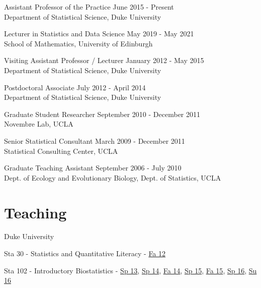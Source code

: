 \documentclass[margin,line]{res}
\begin{document}
\begin{resume}
Assistant Professor of the Practice \hfill June 2015 - Present \\
{Department of Statistical Science}, Duke University \\
\vspace{-0.5cm}

Lecturer in Statistics and Data Science \hfill May 2019 - May 2021 \\
{School of Mathematics}, University of Edinburgh \\
\vspace{-0.5cm}

Visiting Assistant Professor / Lecturer  \hfill January 2012 - May 2015 \\
{Department of Statistical Science}, Duke University \\
\vspace{-0.5cm}

Postdoctoral Associate  \hfill July 2012 - April 2014 \\
{Department of Statistical Science}, Duke University \\
\vspace{-0.5cm}

Graduate Student Researcher \hfill September 2010 - December 2011 \\
{Novembre Lab}, UCLA \\
\vspace{-0.5cm}

Senior Statistical Consultant \hfill March 2009 - December 2011 \\
{Statistical Consulting Center}, UCLA \\
\vspace{-0.50cm}

Graduate Teaching Assistant \hfill September 2006 - July 2010 \\
{Dept. of Ecology and Evolutionary Biology, Dept. of Statistics}, UCLA \\


\section{\sc Teaching}


Duke University

\begin{list1}
\item[] Sta 30 - Statistics and Quantitative Literacy - \href{http://stat.duke.edu/courses/Spring12/sta10.1}{Fa 12}

\item[] Sta 102 - Introductory Biostatistics - \href{http://stat.duke.edu/courses/Spring13/sta102.001/}{Sp 13}, \href{https://stat.duke.edu/~cr173/Sta102_Sp14/}{Sp 14}, \href{https://stat.duke.edu/~cr173/Sta102_Fa14/}{Fa 14}, \href{https://stat.duke.edu/~cr173/Sta102_Sp15/}{Sp 15}, \href{https://stat.duke.edu/~cr173/Sta102_Fa15/}{Fa 15}, \href{http://stat.duke.edu/~cr173/Sta112_Sp16/}{Sp 16}, \href{http://stat.duke.edu/~cr173/Sta102_Su16/}{Su 16}


\end{list1}
\end{resume}
\end{document}

